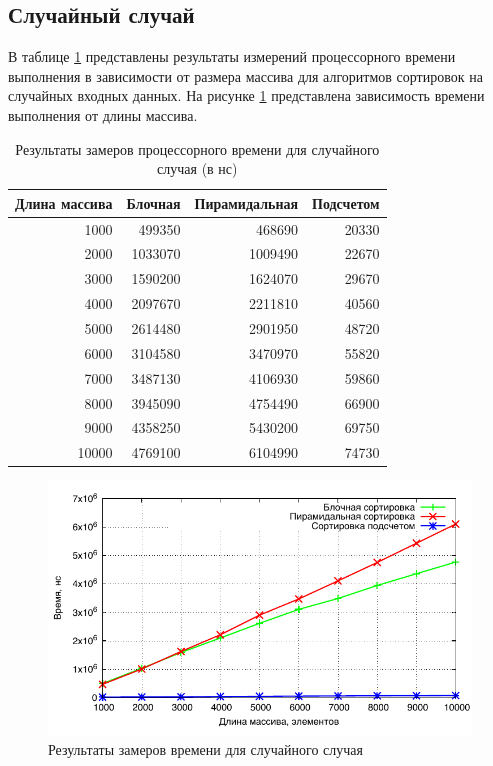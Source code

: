 \subsection{Случайный случай}

В таблице \ref{table:time_random} представлены результаты измерений процессорного времени выполнения в зависимости от размера массива для алгоритмов сортировок на случайных входных данных. На рисунке \ref{img:time_random} представлена зависимость времени выполнения от длины массива.

\begin{table}[h]
  \caption{\label{table:time_random} Результаты замеров процессорного времени для случайного случая (в нс)}
  \begin{center}
    \begin{tabular}{|r|r|r|r|}
      \hline
      Длина массива & Блочная & Пирамидальная & Подсчетом\\ \hline
1000 & 499350 & 468690 & 20330 \\ \hline 
2000 & 1033070 & 1009490 & 22670 \\ \hline 
3000 & 1590200 & 1624070 & 29670 \\ \hline 
4000 & 2097670 & 2211810 & 40560 \\ \hline 
5000 & 2614480 & 2901950 & 48720 \\ \hline 
6000 & 3104580 & 3470970 & 55820 \\ \hline 
7000 & 3487130 & 4106930 & 59860 \\ \hline 
8000 & 3945090 & 4754490 & 66900 \\ \hline 
9000 & 4358250 & 5430200 & 69750 \\ \hline 
10000 & 4769100 & 6104990 & 74730 \\ \hline 


    \end{tabular}
  \end{center}
\end{table}

\newpage

\noindent
\begin{figure}[h!]
	\centering
    \includegraphics[width=0.75\linewidth]{../data/time_random}
    \caption{Результаты замеров времени для случайного случая}
    \label{img:time_random}
\end{figure}

